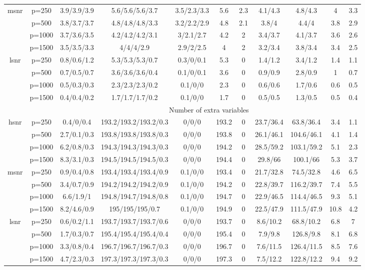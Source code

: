 \begin{table}[ht]
{\begin{tabular}{|c|c|ccccccccc|}
  \midrule\multirow{4}[2]{*}{msnr} & p=250 & 3.9/3.9/3.9 & 5.6/5.6/5.6/3.7 & 3.5/2.3/3.3 & 5.6 & 2.3 & 4.1/4.3 & 4.8/4.3 & 4 & 3.3 \\ 
   & p=500 & 3.8/3.7/3.7 & 4.8/4.8/4.8/3.3 & 3.2/2.2/2.9 & 4.8 & 2.1 & 3.8/4 & 4.4/4 & 3.8 & 2.9 \\ 
   & p=1000 & 3.7/3.6/3.5 & 4.2/4.2/4.2/3.1 & 3/2.1/2.7 & 4.2 & 2 & 3.4/3.7 & 4.1/3.7 & 3.6 & 2.6 \\ 
   & p=1500 & 3.5/3.5/3.3 & 4/4/4/2.9 & 2.9/2/2.5 & 4 & 2 & 3.2/3.4 & 3.8/3.4 & 3.4 & 2.5 \\ 
  \midrule\multirow{4}[2]{*}{lsnr} & p=250 & 0.8/0.6/1.2 & 5.3/5.3/5.3/0.7 & 0.3/0/0.1 & 5.3 & 0 & 1.4/1.2 & 3.4/1.2 & 1.4 & 1.1 \\ 
   & p=500 & 0.7/0.5/0.7 & 3.6/3.6/3.6/0.4 & 0.1/0/0.1 & 3.6 & 0 & 0.9/0.9 & 2.8/0.9 & 1 & 0.7 \\ 
   & p=1000 & 0.5/0.3/0.3 & 2.3/2.3/2.3/0.2 & 0.1/0/0 & 2.3 & 0 & 0.6/0.6 & 1.7/0.6 & 0.6 & 0.5 \\ 
   & p=1500 & 0.4/0.4/0.2 & 1.7/1.7/1.7/0.2 & 0.1/0/0 & 1.7 & 0 & 0.5/0.5 & 1.3/0.5 & 0.5 & 0.4 \\ 
   \midrule 
 \multicolumn{1}{|c}{} &       & \multicolumn{9}{c|}{Number of extra variables} \\
\midrule\multirow{4}[2]{*}{hsnr} & p=250 & 0.4/0/0.4 & 193.2/193.2/193.2/0.3 & 0/0/0 & 193.2 & 0 & 23.7/36.4 & 63.8/36.4 & 3.4 & 1.1 \\ 
   & p=500 & 2.7/0.1/0.3 & 193.8/193.8/193.8/0.3 & 0/0/0 & 193.8 & 0 & 26.1/46.1 & 104.6/46.1 & 4.1 & 1.4 \\ 
   & p=1000 & 6.2/0.8/0.3 & 194.3/194.3/194.3/0.3 & 0/0/0 & 194.2 & 0 & 28.5/59.2 & 103.1/59.2 & 5.1 & 2.3 \\ 
   & p=1500 & 8.3/3.1/0.3 & 194.5/194.5/194.5/0.3 & 0/0/0 & 194.4 & 0 & 29.8/66 & 100.1/66 & 5.3 & 3.7 \\ 
  \midrule\multirow{4}[2]{*}{msnr} & p=250 & 0.9/0.4/0.8 & 193.4/193.4/193.4/0.9 & 0.1/0/0 & 193.4 & 0 & 21.7/32.8 & 74.5/32.8 & 4.6 & 6.5 \\ 
   & p=500 & 3.4/0.7/0.9 & 194.2/194.2/194.2/0.9 & 0.1/0/0 & 194.2 & 0 & 22.8/39.7 & 116.2/39.7 & 7.4 & 5.5 \\ 
   & p=1000 & 6.6/1.9/1 & 194.8/194.7/194.8/0.8 & 0.1/0/0 & 194.7 & 0 & 22.9/46.5 & 114.4/46.5 & 9.3 & 5.1 \\ 
   & p=1500 & 8.2/4.6/0.9 & 195/195/195/0.7 & 0.1/0/0 & 194.9 & 0 & 22.5/47.9 & 111.5/47.9 & 10.8 & 4.2 \\ 
  \midrule\multirow{4}[2]{*}{lsnr} & p=250 & 0.6/0.2/1.1 & 193.7/193.7/193.7/0.6 & 0/0/0 & 193.7 & 0 & 8.6/10.2 & 68.8/10.2 & 6.8 & 7 \\ 
   & p=500 & 1.7/0.3/0.7 & 195.4/195.4/195.4/0.4 & 0/0/0 & 195.4 & 0 & 7.9/9.8 & 126.8/9.8 & 8.1 & 6.8 \\ 
   & p=1000 & 3.3/0.8/0.4 & 196.7/196.7/196.7/0.3 & 0/0/0 & 196.7 & 0 & 7.6/11.5 & 126.4/11.5 & 8.5 & 7.6 \\ 
   & p=1500 & 4.7/2.3/0.3 & 197.3/197.3/197.3/0.3 & 0/0/0 & 197.3 & 0 & 7.5/12.2 & 122.8/12.2 & 9.4 & 9.2 \\ 
   \bottomrule 
\end{tabular}
}
\end{table}

